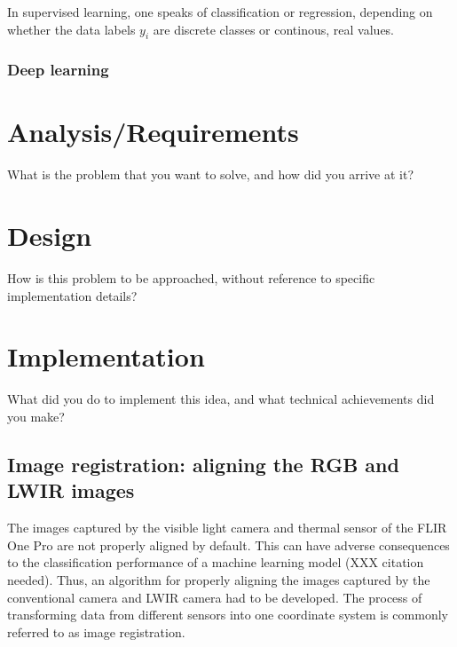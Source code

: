 \documentclass{l4proj}
\begin{document}
In supervised learning, one speaks of classification or regression, depending on whether the data labels $y_i$ are discrete classes or continous, real values.

\subsection{Deep learning}






\chapter{Analysis/Requirements}
What is the problem that you want to solve, and how did you arrive at it?



\chapter{Design}
How is this problem to be approached, without reference to specific implementation details? 


\chapter{Implementation}
What did you do to implement this idea, and what technical achievements did you make?

\section{Image registration: aligning the RGB and LWIR images}

The images captured by the visible light camera and thermal sensor of the FLIR One Pro are not properly aligned by default. This can have adverse consequences to the classification performance of a machine learning model (XXX citation needed). Thus, an algorithm for properly aligning the images captured by the conventional camera and LWIR camera had to be developed. The process of transforming data from different sensors into one coordinate system is commonly referred to as image registration.
\end{document}
